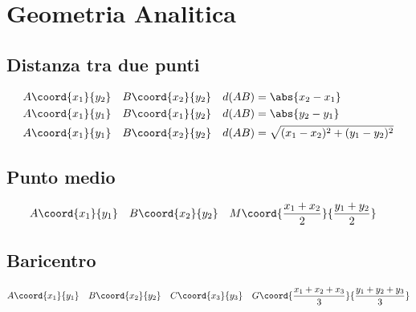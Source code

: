 \chapter{Geometria Analitica}
\section{Distanza tra due punti}
\begin{align*}
A\coord{x_1}{y_2}&& B\coord{x_2}{y_2}&&&  d(AB)=\abs{x_2-x_1}\\
A\coord{x_1}{y_1} && B\coord{x_1}{y_2}&&&  d(AB)=\abs{y_2-y_1}\\
A\coord{x_1}{y_1} && B\coord{x_2}{y_2}&&&  d(AB)=\sqrt{(x_1-x_2)^2+(y_1-y_2)^2}
\end{align*}
\section{Punto medio}
\begin{align*}
A\coord{x_1}{y_1}&& B\coord{x_2}{y_2}&&& M\coord{\dfrac{x_1+x_2}{2}}{\dfrac{y_1+y_2}{2}}
\end{align*}
\section{Baricentro}
\begin{align*}
A\coord{x_1}{y_1}& &B\coord{x_2}{y_2}&&C\coord{x_3}{y_3}&& G\coord{\dfrac{x_1+x_2+x_3}{3}}{\dfrac{y_1+y_2+y_3}{3}}
\end{align*}